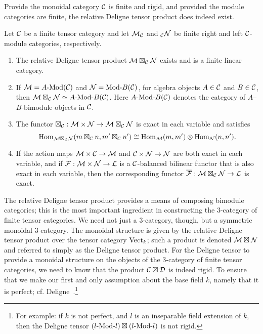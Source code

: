 \documentclass{amsart}
\begin{document}
Provide the monoidal category $\mathcal C$ is finite and rigid, and provided the module categories are finite, the relative Deligne tensor product does indeed exist.

\begin{theorem} \label{thm:DelignePrdtOverATCExists}
	Let $\mathcal C$ be a finite tensor category and let $\mathcal M_{\mathcal C}$ and ${}_{\mathcal C}\mathcal N$ be finite right and left $\mathcal C$-module categories, respectively. 
	\begin{enumerate}
		\item The relative Deligne tensor product $\mathcal M \boxtimes_{\mathcal C} \mathcal N$ exists and is a finite linear category.
		\item If $\cM = \Mod{A}{}(\cC)$ and $\cN = \Mod{}{B}(\cC)$, for algebra objects $A \in \mathcal C$ and $B \in \mathcal C$, then $\cM \boxtimes_{\cC} \cN \simeq \Mod{A }{B}(\cC)$. Here $\Mod{A}{B}(\cC)$ denotes the category of $A$--$B$-bimodule objects in $\mathcal C$.

		\item The functor $\boxtimes_{\mathcal C}: \mathcal M \times \mathcal N \rightarrow \mathcal M \boxtimes_\mathcal C \mathcal N$ is exact in each variable and satisfies 
		\begin{equation*}
			\operatorname{Hom}_{\mathcal M \boxtimes_{\mathcal C} \mathcal N} (m \boxtimes_\mathcal C n, m' \boxtimes_\mathcal C n') \cong \operatorname{Hom}_{\mathcal M}(m,m') \otimes \operatorname{Hom}_{\mathcal N}(n, n').
		\end{equation*}
		\item If the action maps $\mathcal M \times \mathcal C \rightarrow \mathcal M$ and $\mathcal C \times \mathcal N \rightarrow \mathcal N$ are both exact in each variable, and if $\mathcal F: \mathcal M \times \mathcal N \to \mathcal L$ is a $\mathcal C$-balanced bilinear functor that is also exact in each variable, then the corresponding functor $\overline{\mathcal F}: \mathcal M \boxtimes_{\mathcal C} \mathcal N \to \mathcal L$ is exact. 
	\end{enumerate} 	
\end{theorem} %

The relative Deligne tensor product provides a means of composing bimodule categories; this is the most important ingredient in constructing the 3-category of finite tensor categories.  We need not just a 3-category, though, but a symmetric monoidal 3-category.  The monoidal structure is given by the relative Deligne tensor product over the tensor category $\mathrm{Vect}_k$; such a product is denoted $\mathcal M \boxtimes \mathcal N$ and referred to simply as the Deligne tensor product.  For the Deligne tensor to provide a monoidal structure on the objects of the 3-category of finite tensor categories, we need to know that the product $\mathcal C \boxtimes \mathcal D$ is indeed rigid.  To ensure that we make our first and only assumption about the base field $k$, namely that it is perfect; cf. Deligne~\cite[Prop 5.17]{deligne}.\footnote{For example: if $k$ is not perfect, and $l$ is an inseparable field extension of $k$, then the Deligne tensor $(\Mod{l}{l}) \boxtimes (\Mod{l}{l})$ is not rigid.} %
\end{document}
